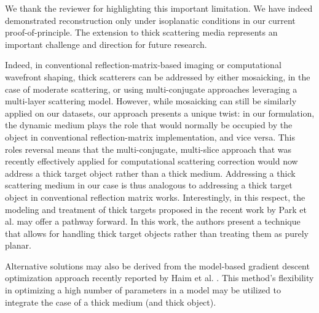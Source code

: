 \documentclass[12pt]{article}
\newenvironment{finished_ourresponse}
    {\begin{tcolorbox}[width=\linewidth,breakable,enhanced,colback=gray!5,colframe=finished_responsecolor!50,title=Response,left=5pt,right=5pt]}
    {\end{tcolorbox}}
\begin{document}
\begin{finished_ourresponse}
    We thank the reviewer for highlighting this important limitation. We have indeed demonstrated reconstruction only under isoplanatic conditions in our current proof-of-principle. The extension to thick scattering media represents an important challenge and direction for future research.

    Indeed, in conventional reflection-matrix-based imaging or computational wavefront shaping, thick scatterers can be addressed by either mosaicking, in the case of moderate scattering, or using multi-conjugate approaches leveraging a multi-layer scattering model. However, while mosaicking can still be similarly applied on our datasets, our approach presents a unique twist: in our formulation, the dynamic medium plays the role that would normally be occupied by the object in conventional reflection-matrix implementation, and vice versa. This roles reversal means that the multi-conjugate, multi-slice approach that was recently effectively applied for computational scattering correction would now address a thick target object rather than a thick medium. Addressing a thick scattering medium in our case is thus analogous to addressing a thick target object in conventional reflection matrix works. Interestingly, in this respect, the modeling and treatment of thick targets proposed in the recent work by Park et al. \cite{oh2025digital} may offer a pathway forward. In this work, the authors present a technique that allows for handling thick target objects rather than treating them as purely planar. 

    Alternative solutions may also be derived from the model-based gradient descent optimization approach recently reported by Haim et al. \cite{haim2025image}. This method's flexibility in optimizing a high number of parameters in a model may be utilized to integrate the case of a thick medium (and thick object).
    

\end{finished_ourresponse}
\end{document}
